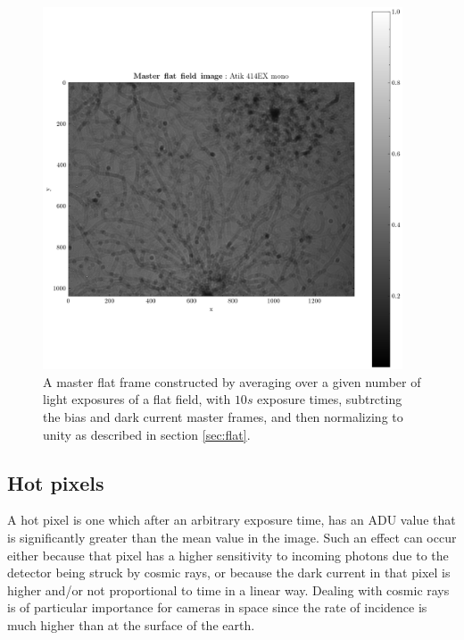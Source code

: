 \documentclass[../main.tex]{subfiles}
\begin{document}
		\begin{figure}[h!]
		\centering
		\includegraphics[width	=0.95\textwidth]{master_flat.png}
		\caption{A master flat frame constructed by averaging over a given number of light exposures of a flat field, with $10s$ exposure times, subtrcting the bias and dark current master frames, and then normalizing to unity as described in section \ref{sec:flat}. }
		\label{fig:masterflat}
	\end{figure}
	
	\subsection{Hot pixels}
	A hot pixel is one which after an arbitrary exposure time, has an ADU value that is significantly greater than the mean value in the image. Such an effect can occur either because that pixel has a higher sensitivity to incoming photons due to the detector being struck by cosmic rays, or because the dark current in that pixel is higher and/or not proportional to time in a linear way. Dealing with cosmic rays is of particular importance for cameras in space since the rate of incidence is much higher than at the surface of the earth.
	
\end{document}
